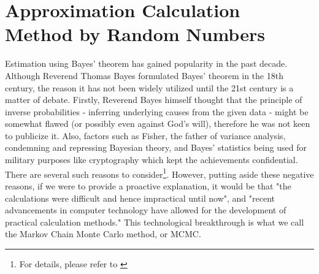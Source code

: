 \documentclass{ltjsarticle}
\begin{document}
\section{Approximation Calculation Method by Random Numbers}
Estimation using Bayes' theorem has gained popularity in the past decade. Although Reverend Thomas Bayes formulated Bayes' theorem in the 18th century, the reason it has not been widely utilized until the 21st century is a matter of debate. Firstly, Reverend Bayes himself thought that the principle of inverse probabilities - inferring underlying causes from the given data - might be somewhat flawed (or possibly even against God's will), therefore he was not keen to publicize it. Also, factors such as Fisher, the father of variance analysis, condemning and repressing Bayesian theory, and Bayes' statistics being used for military purposes like cryptography which kept the achievements confidential. There are several such reasons to consider\footnote{For details, please refer to \textcite{mcgrayne2011theory}}. However, putting aside these negative reasons, if we were to provide a proactive explanation, it would be that "the calculations were difficult and hence impractical until now", and "recent advancements in computer technology have allowed for the development of practical calculation methods." This technological breakthrough is what we call the Markov Chain Monte Carlo method, or MCMC.
\end{document}
